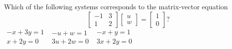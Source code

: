 \begin{activity}
Which of the following systems corresponds to the matrix-vector equation
\begin{equation*}
\begin{bmatrix} -1&3\\1&2 \end{bmatrix}\begin{bmatrix} u\\w \end{bmatrix}=\begin{bmatrix} 1\\0 \end{bmatrix}?
\end{equation*}
{\(\begin{matrix} -x+3y=1\\x+2y=0 \end{matrix}\)}
{\(\begin{matrix} -u+w=1\\3u+2w=0 \end{matrix}\)}
{\(\begin{matrix} -x+y=1\\3x+2y=0 \end{matrix}\)}
\end{activity}




